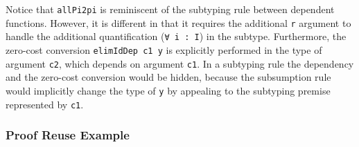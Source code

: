 \documentclass[acmsmall]{acmart}\settopmatter{}
\begin{document}
Notice that \verb;allPi2pi; is reminiscent of the subtyping rule
between dependent functions. However, it is different in that it
requires the additional \verb;r; argument to handle the additional
quantification (\verb;∀ i : I;) in the subtype. Furthermore, the zero-cost
conversion \verb;elimIdDep c1 y; is explicitly performed in the type of
argument \verb;c2;, which depends on argument \verb;c1;. In a
subtyping rule the dependency and the zero-cost conversion would be
hidden, because the subsumption rule would implicitly change the type of
\verb;y; by appealing to the subtyping premise represented by \verb;c1;.

\subsubsection{Proof Reuse Example}
\end{document}
